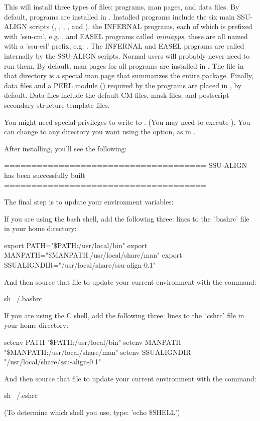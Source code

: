 
This will install three types of files: programs, man pages, and data
files.  By default, programs are installed in
. Installed programs include the six main
SSU-ALIGN scripts (, ,
, ,  and
), the INFERNAL programs, each of which is prefixed
with 'ssu-cm', e.g. , and EASEL programs called
\emph{miniapps}, these are all named with a 'ssu-esl' prefix,
e.g. . The INFERNAL and EASEL programs are
called internally by the SSU-ALIGN scripts. Normal users will probably
never need to run them.  By default, man pages for all programs are
installed in . The file  in that
directory is a special man page that summarizes the entire package.
Finally, data files and a PERL module () required by the
programs are placed in , by
default. Data files include the default CM files, mask files, and
postscript secondary structure template files.

You might need special privileges to write to . (You may need to execute
). You can change  to any
directory you want using the  option, as in
.

After installing, you'll see the following:

\begin{sreoutput}
=====================================
SSU-ALIGN has been successfully built
=====================================

The final step is to update your environment variables:

If you are using the bash shell, add the following three:
lines to the '.bashrc' file in your home directory:

export PATH="\$PATH:/usr/local/bin"
export MANPATH="\$MANPATH:/usr/local/share/man"
export SSUALIGNDIR="/usr/local/share/ssu-align-0.1"

And then source that file to update your current
environment with the command:

sh ~/.bashrc

If you are using the C shell, add the following three:
lines to the '.cshrc' file in your home directory:

setenv PATH "\$PATH:/usr/local/bin"
setenv MANPATH "\$MANPATH:/usr/local/share/man"
setenv SSUALIGNDIR "/usr/local/share/ssu-align-0.1"

And then source that file to update your current
environment with the command:

sh ~/.cshrc

(To determine which shell you use, type: 'echo \$SHELL')
\end{sreoutput}


